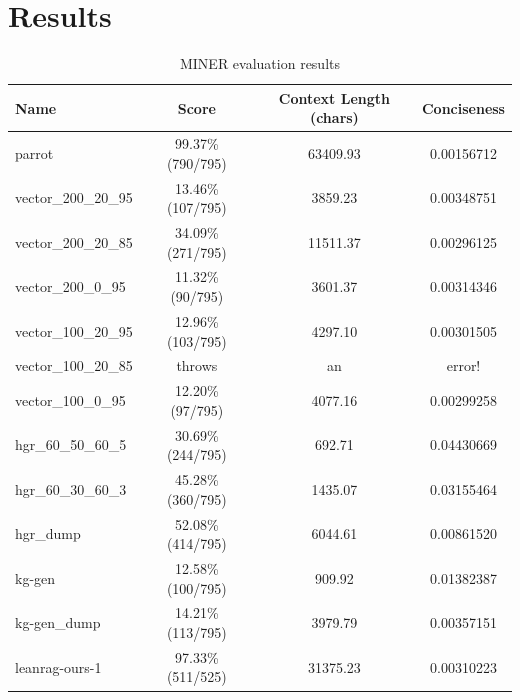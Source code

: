 \section{Results}

\begin{table}[h]
\centering
\begin{tabular}{lccc}
\toprule
Name & Score & Context Length (chars) & Conciseness \\
\midrule
parrot & 99.37\% (790/795) & 63409.93 & 0.00156712 \\
vector\_200\_20\_95 & 13.46\% (107/795) & 3859.23 & 0.00348751 \\
vector\_200\_20\_85 & 34.09\% (271/795) & 11511.37 & 0.00296125 \\
vector\_200\_0\_95 & 11.32\% (90/795) & 3601.37 & 0.00314346 \\
vector\_100\_20\_95 & 12.96\% (103/795) & 4297.10 & 0.00301505 \\
vector\_100\_20\_85 & throws & an & error! \\
vector\_100\_0\_95 & 12.20\% (97/795) & 4077.16 & 0.00299258 \\
hgr\_60\_50\_60\_5 & 30.69\% (244/795) & 692.71 & 0.04430669 \\
hgr\_60\_30\_60\_3 & 45.28\% (360/795) & 1435.07 & 0.03155464 \\
hgr\_dump & 52.08\% (414/795) & 6044.61 & 0.00861520 \\
kg-gen & 12.58\% (100/795) & 909.92 & 0.01382387 \\
kg-gen\_dump & 14.21\% (113/795) & 3979.79 & 0.00357151 \\
leanrag-ours-1 & 97.33\% (511/525) & 31375.23 & 0.00310223 \\
\bottomrule
\end{tabular}
\caption{MINER evaluation results}
\label{tab:results}
\end{table}

\lipsum[1]